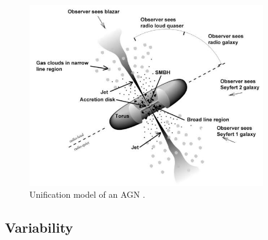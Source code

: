 \begin{figure}[!ht]
	\centering
	\includegraphics[width=0.9\textwidth]{pictures/Chapter2/AGN_unified_model.jpg}
	\caption{Unification model of an AGN \parencite{fermi2025figure1}.}
	\label{fig:agn_sed}
\end{figure}



\subsection{Variability}
\label{sec:variability}

